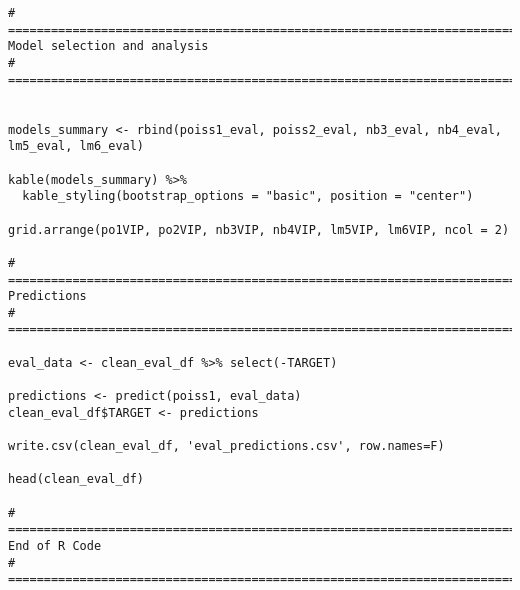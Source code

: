 \documentclass[
]{article}
\begin{document}
\begin{verbatim}
# =====================================================================================
Model selection and analysis
# =====================================================================================


models_summary <- rbind(poiss1_eval, poiss2_eval, nb3_eval, nb4_eval, lm5_eval, lm6_eval)

kable(models_summary) %>% 
  kable_styling(bootstrap_options = "basic", position = "center")
  
grid.arrange(po1VIP, po2VIP, nb3VIP, nb4VIP, lm5VIP, lm6VIP, ncol = 2)

# =====================================================================================
Predictions
# =====================================================================================

eval_data <- clean_eval_df %>% select(-TARGET)

predictions <- predict(poiss1, eval_data)
clean_eval_df$TARGET <- predictions

write.csv(clean_eval_df, 'eval_predictions.csv', row.names=F)

head(clean_eval_df)
        
# =====================================================================================
End of R Code
# =====================================================================================
\end{verbatim}
\end{document}
